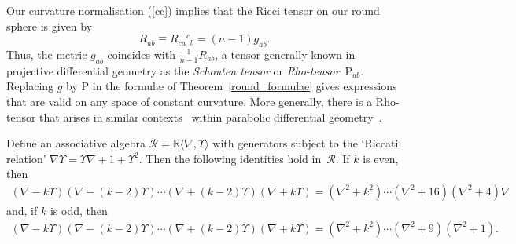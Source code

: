 \documentclass[pdftex]{sigma}
\newcommand{\Rho}{{\mathrm{P}}}
\begin{document}
\begin{remark}Our curvature normalisation (\ref{cc}) implies that the Ricci
tensor on our round sphere is given by
\[R_{ab}\equiv R_{ca}{}^c{}_b=(n-1)g_{ab}.\]
Thus, the metric $g_{ab}$ coincides with $\frac{1}{n-1}R_{ab}$, a tensor
generally known in projective dif\/ferential geometry \cite{eProjective} as the
{\em Schouten tensor\/} or {\em Rho-tensor\/}~$\Rho_{ab}$. Replacing $g$ by
$\Rho$ in the formul{\ae} of Theorem~\ref{round_formulae} gives expressions
that are valid on any space of constant curvature. More generally, there is a
Rho-tensor that arises in similar contexts~\cite{cds} within parabolic
dif\/ferential geometry~\cite{thebook}.
\end{remark}
\begin{lemma}\label{pretricky} Define an associative algebra
${\mathcal{R}}={\mathbb{R}}\langle\nabla,\Upsilon\rangle$ with generators
subject to the `Riccati relation'
$\nabla\Upsilon=\Upsilon\nabla+1+\Upsilon^2$. Then the following identities
hold in~${\mathcal{R}}$. If $k$ is even, then
\begin{gather*}
(\nabla-k\Upsilon)(\nabla-(k-2)\Upsilon)\cdots
(\nabla+(k-2)\Upsilon)(\nabla+k\Upsilon)=
(\nabla^2+k^2)\cdots(\nabla^2+16)(\nabla^2+4)\nabla\!
\end{gather*}
and, if $k$ is odd, then
\begin{gather*}
(\nabla-k\Upsilon)(\nabla-(k-2)\Upsilon)\cdots
(\nabla+(k-2)\Upsilon)(\nabla+k\Upsilon)=
(\nabla^2+k^2)\cdots(\nabla^2+9)(\nabla^2+1).
\end{gather*}
\end{lemma}
\end{document}
